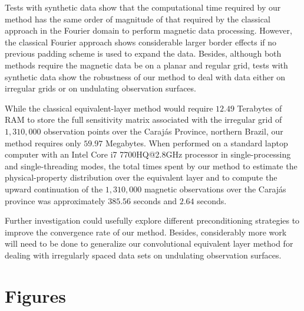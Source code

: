 \documentclass[manuscript]{geophysics}
\begin{document}
Tests with synthetic data show that the computational time required by our method has 
the same order of magnitude of that required by the classical approach in the Fourier domain
to perform magnetic data processing.
However, the classical Fourier approach shows considerable larger border effects if no previous 
padding scheme is used to expand the data. 
Besides, although both methods require the magnetic data be on a planar and regular grid, 
tests with synthetic data show the robustness of our method to deal with data either on irregular grids
or on undulating observation surfaces.

While the classical equivalent-layer method would require $12.49$ Terabytes of RAM to store the full
sensitivity matrix associated with the irregular grid of $1,310,000$ observation points over the
Carajás Province, northern Brazil, our method requires only $59.97$ Megabytes.
When performed on a standard laptop computer with an Intel Core i7 7700HQ@2.8GHz processor in
single-processing and single-threading modes, the total times spent by our method to estimate the
physical-property distribution over the equivalent layer and to compute the upward continuation
of the $1,310,000$ magnetic observations over the Carajás province was approximately $385.56$ 
seconds and $2.64$ seconds.

Further investigation could usefully explore different preconditioning strategies to improve the
convergence rate of our method. Besides, considerably more work will need to be done to generalize
our convolutional equivalent layer method for dealing with irregularly spaced data sets on 
undulating observation surfaces.

\clearpage

\section{Figures}


\end{document}
